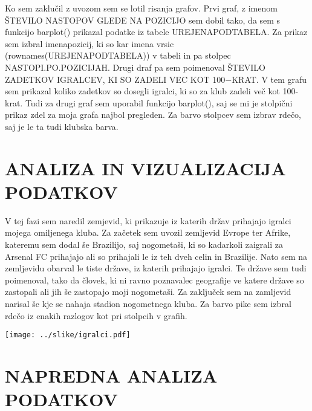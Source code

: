\documentclass[11pt,a4paper]{article}
\begin{document}
Ko sem zaklučil z uvozom sem se lotil risanja grafov. Prvi graf, z imenom ŠTEVILO NASTOPOV GLEDE NA POZICIJO sem dobil tako, da sem s funkcijo barplot() prikazal podatke iz tabele UREJENAPODTABELA. Za prikaz sem izbral imenapozicij, ki so kar imena vrsic (rownames(UREJENAPODTABELA)) v tabeli in pa stolpec NASTOPI.PO.POZICIJAH.
Drugi draf pa sem poimenoval ŠTEVILO ZADETKOV IGRALCEV, KI SO ZADELI VEC KOT 100−KRAT. V tem grafu sem prikazal koliko zadetkov so dosegli igralci, ki so za klub zadeli več kot 100-krat. Tudi za drugi graf sem uporabil funkcijo barplot(), saj se mi je stolpični prikaz zdel za moja grafa najbol pregleden. Za barvo stolpcev sem izbrav rdečo, saj je le ta tudi klubska barva.




\newpage
\section{ANALIZA IN VIZUALIZACIJA PODATKOV}
V tej fazi sem naredil zemjevid, ki prikazuje iz katerih držav prihajajo igralci mojega omiljenega kluba. Za začetek sem uvozil zemljevid Evrope ter Afrike, kateremu sem dodal še Brazilijo, saj nogometaši, ki so kadarkoli zaigrali za Arsenal FC prihajajo ali so prihajali le iz teh dveh celin in Brazilije. Nato sem na zemljevidu obarval le tiste države, iz katerih prihajajo igralci. Te države sem tudi poimenoval, tako da človek, ki ni ravno poznavalec geografije ve katere države so zastopali ali jih še zastopajo moji nogometaši. Za zaključek sem na zamljevid narisal še kje se nahaja stadion nogometnega kluba. Za barvo pike sem izbral rdečo iz enakih razlogov kot pri stolpcih v grafih.

\texttt{[image: ../slike/igralci.pdf]}

\section{NAPREDNA ANALIZA PODATKOV}
\end{document}

